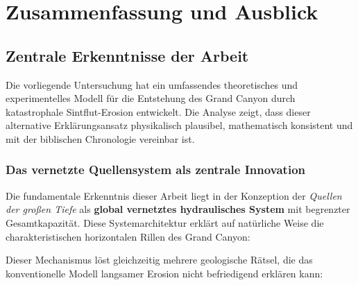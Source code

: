 ﻿\documentclass[12pt,a4paper]{report}
\begin{document}
\chapter{Zusammenfassung und Ausblick}

\section{Zentrale Erkenntnisse der Arbeit}

Die vorliegende Untersuchung hat ein umfassendes theoretisches und experimentelles Modell für die Entstehung des Grand Canyon durch katastrophale Sintflut-Erosion entwickelt. Die Analyse zeigt, dass dieser alternative Erklärungsansatz physikalisch plausibel, mathematisch konsistent und mit der biblischen Chronologie vereinbar ist.

\subsection{Das vernetzte Quellensystem als zentrale Innovation}

Die fundamentale Erkenntnis dieser Arbeit liegt in der Konzeption der \textit{Quellen der großen Tiefe} als \textbf{global vernetztes hydraulisches System} mit begrenzter Gesamtkapazität. Diese Systemarchitektur erklärt auf natürliche Weise die charakteristischen horizontalen Rillen des Grand Canyon:

\begin{center}
\end{center}

Dieser Mechanismus löst gleichzeitig mehrere geologische Rätsel, die das konventionelle Modell langsamer Erosion nicht befriedigend erklären kann:
\end{document}
